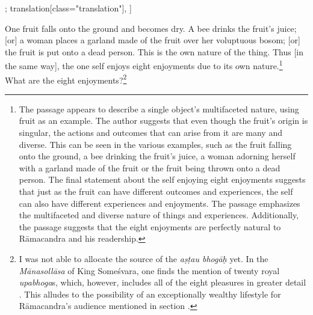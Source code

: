 \begin{alignment}[
  texts=edition[class="edition"];
  translation[class="translation"],
  ]
\begin{translation}
\begin{tlate}[p22_03]
      One fruit falls onto the ground and becomes dry. A bee drinks the fruit's juice; 
      [or] a woman places a garland made of the fruit over her voluptuous bosom; 
      [or] the fruit is put onto a dead person. This is the own nature of the thing. 
      Thus [in the same way], the one self enjoys eight enjoyments due to its own nature.\footnote{The passage appears to describe a single object's multifaceted nature, using fruit as an example. 
      The author suggests that even though the fruit's origin is singular, the actions and outcomes that can arise from it are many and diverse. 
      This can be seen in the various examples, such as the fruit falling onto the ground, a bee drinking the fruit's juice, 
      a woman adorning herself with a garland made of the fruit or the fruit being thrown onto a dead person. 
      The final statement about the self enjoying eight enjoyments suggests that just as the fruit can have different outcomes and experiences, 
      the self can also have different experiences and enjoyments. The passage emphasizes the multifaceted and diverse nature of things and experiences.
       Additionally, the passage suggests that the eight enjoyments are perfectly natural to Rāmacandra and his readership.}
      \\
      What are the eight enjoyments?\footnote{I was not able to allocate the source of the \textit{aṣṭau bhogāḥ} yet.
       In the \textit{Mānasollāsa} of King Someśvara, one finds the mention of twenty royal \textit{upabhoga}s, which, however,
      includes all of the eight pleasures in greater detail \parencite[5]{manasollasa}. 
      This alludes to the possibility of an exceptionally wealthy lifestyle for Rāmacandra's audience mentioned in section .}
      \end{tlate}
    \begin{tlate}[22_1]

\end{tlate}
\end{translation}
\end{alignment}
